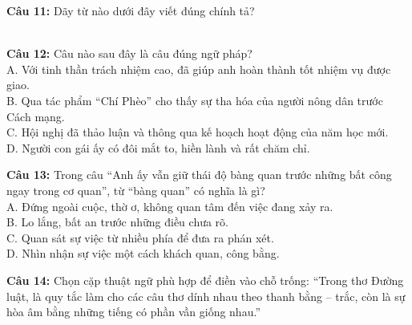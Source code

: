 \documentclass[12pt,a4paper]{article}
\begin{document}


\vspace{0.3cm}

\noindent \textbf{Câu 11:} Dãy từ nào dưới đây viết đúng chính tả?\\
\noindent{}\\
\noindent{}



\vspace{0.3cm}

\noindent \textbf{Câu 12:} Câu nào sau đây là câu đúng ngữ pháp?\\
\noindent A. Với tinh thần trách nhiệm cao, đã giúp anh hoàn thành tốt nhiệm vụ được giao.\\
\noindent B. Qua tác phẩm ``Chí Phèo'' cho thấy sự tha hóa của người nông dân trước Cách mạng.\\
\noindent C. Hội nghị đã thảo luận và thông qua kế hoạch hoạt động của năm học mới.\\
\noindent D. Người con gái ấy có đôi mắt to, hiền lành và rất chăm chỉ.



\vspace{0.3cm}

\noindent \textbf{Câu 13:} Trong câu ``Anh ấy vẫn giữ thái độ bàng quan trước những bất công ngay trong cơ quan'', từ ``bàng quan'' có nghĩa là gì?\\
\noindent A. Đứng ngoài cuộc, thờ ơ, không quan tâm đến việc đang xảy ra.\\
\noindent B. Lo lắng, bất an trước những điều chưa rõ.\\
\noindent C. Quan sát sự việc từ nhiều phía để đưa ra phán xét.\\
\noindent D. Nhìn nhận sự việc một cách khách quan, công bằng.



\vspace{0.3cm}

\noindent \textbf{Câu 14:} Chọn cặp thuật ngữ phù hợp để điền vào chỗ trống: ``Trong thơ Đường luật, \underline{\hspace{1cm}} là quy tắc làm cho các câu thơ dính nhau theo thanh bằng – trắc, còn \underline{\hspace{1cm}} là sự hòa âm bằng những tiếng có phần vần giống nhau.''\\
\noindent{}
\end{document}

